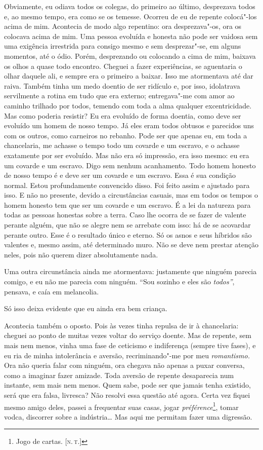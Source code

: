 Obviamente, eu odiava todos os colegas, do primeiro ao último,
desprezava todos e, ao mesmo tempo, era como se os temesse. Ocorreu de
eu de repente colocá"-los acima de mim. Acontecia de modo algo repentino:
ora desprezava"-os, ora os colocava acima de mim. Uma pessoa evoluída e
honesta não pode ser vaidosa sem uma exigência irrestrida para consigo
mesmo e sem desprezar"-se, em alguns momentos, até o ódio. Porém,
desprezando ou colocando a cima de mim, baixava os olhos a quase todo
encontro. Cheguei a fazer experiências, se aguentaria o olhar daquele
ali, e sempre era o primeiro a baixar. Isso me atormentava até dar
raiva. Também tinha um medo doentio de ser ridículo e, por isso,
idolatrava servilmente a rotina em tudo que era externo; entregava"-me
com amor ao caminho trilhado por todos, temendo com toda a alma qualquer
excentricidade. Mas como poderia resistir? Eu era evoluído de forma
doentia, como deve ser evoluído um homem de nosso tempo. Já eles eram
todos obtusos e parecidos uns com os outros, como carneiros no rebanho.
Pode ser que apenas eu, em toda a chancelaria, me achasse o tempo todo
um covarde e um escravo, e o achasse exatamente por ser evoluído. Mas
não era só impressão, era isso mesmo: eu era um covarde e um escravo.
Digo sem nenhum acanhamento. Todo homem honesto de nosso tempo é e deve
ser um covarde e um escravo. Essa é sua condição normal. Estou
profundamente convencido disso. Foi feito assim e ajustado para isso. E
não no presente, devido a circustâncias casuais, mas em todos os tempos
o homem honesto tem que ser um covarde e um escravo. É a lei da natureza
para todas as pessoas honestas sobre a terra. Caso lhe ocorra de se
fazer de valente perante alguém, que não se alegre nem se arrebate com
isso: há de se acovardar perante outro. Esse é o resultado único e
eterno. Só os asnos e seus híbridos são valentes e, mesmo assim, até
determinado muro. Não se deve nem prestar atenção neles, pois não querem
dizer absolutamente nada.

Uma outra circunstância ainda me atormentava: justamente que ninguém
parecia comigo, e eu não me parecia com ninguém. ``Sou sozinho e eles
são \emph{todos''}, pensava, e caía em melancolia.

Só isso deixa evidente que eu ainda era bem criança.

Acontecia também o oposto. Pois às vezes tinha repulsa de ir à
chancelaria: cheguei ao ponto de muitas vezes voltar do serviço doente.
Mas de repente, sem mais nem menos, vinha uma fase de ceticismo e
indiferença (sempre tive fases), e eu ria de minha intolerância e
aversão, recriminando"-me por meu \emph{romantismo.} Ora não queria falar
com ninguém, ora chegava não apenas a puxar conversa, como a imaginar
fazer amizade. Toda aversão de repente desaparecia num instante, sem
mais nem menos. Quem sabe, pode ser que jamais tenha existido, será que
era falsa, livresca? Não resolvi essa questão até agora. Certa vez
fiquei mesmo amigo deles, passei a frequentar suas casas, jogar
\emph{préférence}\footnote{Jogo de cartas. {[}\textsc{n.\,t.}{]}}, tomar
vodca, discorrer sobre a indústria\ldots{} Mas aqui me permitam fazer uma
digressão.


